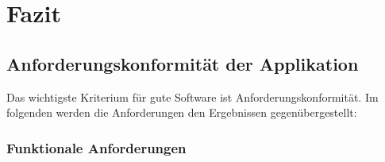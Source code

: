 \section{Fazit}

\subsection{Anforderungskonformität der Applikation}

Das wichtigste Kriterium für gute Software ist Anforderungskonformität. Im folgenden werden die Anforderungen den Ergebnissen gegenübergestellt:

\subsubsection{Funktionale Anforderungen}

